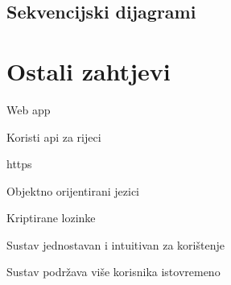 				
			\subsection{Sekvencijski dijagrami}
				
%				
	
		\section{Ostali zahtjevi}
		
			\begin{packed_enum}
				
				\item Web app
				\item Koristi api za rijeci
				\item https
				\item Objektno orijentirani jezici
				\item Kriptirane lozinke
				\item Sustav jednostavan i intuitivan za korištenje
				\item Sustav podržava više korisnika istovremeno
				
			\end{packed_enum}
		
%		 
			 
			 
			 
	